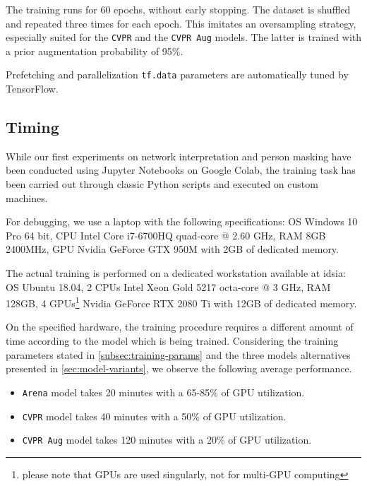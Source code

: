 The training runs for 60 epochs, without early stopping. The dataset is shuffled and repeated three times for each epoch. This imitates an oversampling strategy, especially suited for the \texttt{CVPR} and the \texttt{CVPR Aug} models. The latter is trained with a prior augmentation probability of 95\%.

Prefetching and parallelization \texttt{tf.data} parameters are automatically tuned by TensorFlow.



\subsection{Timing}
\label{subsec:training-timing}

While our first experiments on network interpretation and person masking have been conducted using Jupyter Notebooks on Google Colab, the training task has been carried out through classic Python scripts and executed on custom machines.

\medskip

For debugging, we use a laptop with the following specifications: OS Windows 10 Pro 64 bit, CPU Intel Core i7-6700HQ quad-core @ 2.60 GHz, RAM 8GB 2400MHz, GPU Nvidia GeForce GTX 950M with 2GB of dedicated memory. 

The actual training is performed on a dedicated workstation available at \gls{idsia}: OS Ubuntu 18.04, 2 CPUs Intel Xeon Gold 5217 octa-core @ 3 GHz, RAM 128GB, 4 GPUs\footnote{please note that GPUs are used singularly, not for multi-GPU computing} Nvidia GeForce RTX 2080 Ti with 12GB of dedicated memory.

\medskip
    
On the specified hardware, the training procedure requires a different amount of time according to the model which is being trained. Considering the training parameters stated in \ref{subsec:training-params} and the three models alternatives presented in \ref{sec:model-variants}, we observe the following average performance.

\begin{itemize}
    \item \texttt{Arena} model takes 20 minutes with a 65-85\% of GPU utilization.
    \item \texttt{CVPR} model takes 40 minutes with a 50\% of GPU utilization.
    \item \texttt{CVPR Aug} model takes 120 minutes with a 20\% of GPU utilization.
\end{itemize}

